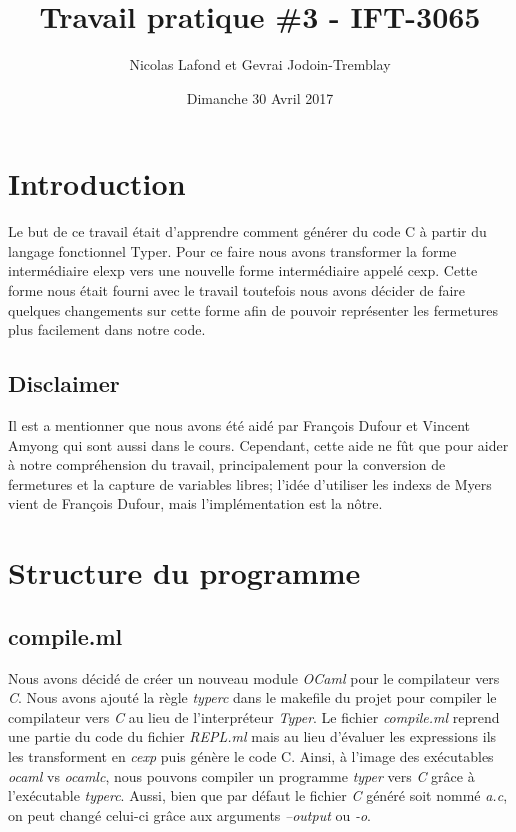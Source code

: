 \documentclass{article}
\begin{document}
\title{Travail pratique \#3 - IFT-3065}
\author{Nicolas Lafond et Gevrai Jodoin-Tremblay}
\date{Dimanche 30 Avril 2017}
\maketitle

\section{Introduction}
Le but de ce travail était d'apprendre comment générer du code C à partir du 
langage fonctionnel Typer. Pour ce faire nous avons transformer la forme
intermédiaire elexp vers une nouvelle forme intermédiaire appelé cexp. Cette
forme nous était fourni avec le travail toutefois nous avons décider de faire
quelques changements sur cette forme afin de pouvoir représenter les fermetures
plus facilement dans notre code.

\subsection{Disclaimer}
Il est a mentionner que nous avons été aidé par François Dufour et Vincent
Amyong qui sont aussi dans le cours. Cependant, cette aide ne fût que pour aider
à notre compréhension du travail, principalement pour la conversion de
fermetures et la capture de variables libres; l'idée d'utiliser les indexs
de Myers vient de François Dufour, mais l'implémentation est la nôtre.
 
\section{Structure du programme}
\subsection{compile.ml}
Nous avons décidé de créer un nouveau module \emph{OCaml} pour le compilateur
vers \emph{C}.
Nous avons ajouté la règle \emph{typerc} dans le makefile du projet pour compiler
le compilateur vers \emph{C} au lieu de l'interpréteur \emph{Typer}. Le fichier
\emph{compile.ml}
reprend une partie du code du fichier \emph{REPL.ml} mais au lieu d'évaluer
les expressions ils les transforment en \emph{cexp} puis génère le code C. Ainsi,
à l'image des exécutables \emph{ocaml} vs \emph{ocamlc}, nous pouvons compiler
un programme \emph{typer} vers \emph{C} grâce à l'exécutable \emph{typerc}.
Aussi, bien que par défaut le fichier \emph{C} généré soit nommé \emph{a.c},
on peut changé celui-ci grâce aux arguments \emph{--output} ou \emph{-o}.
\end{document}
